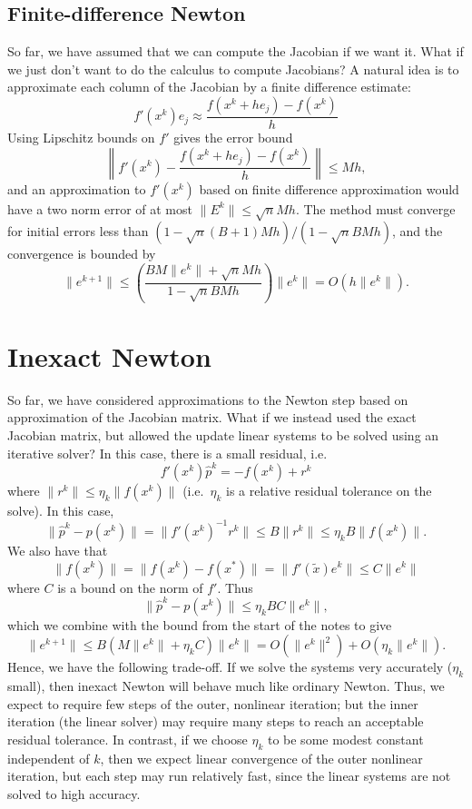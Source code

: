 \documentclass[12pt, leqno]{article} %
\begin{document}
\subsection*{Finite-difference Newton}

So far, we have assumed that we can compute the Jacobian if we want
it.  What if we just don't want to do the calculus to compute
Jacobians?  A natural idea is to approximate each column of the
Jacobian by a finite difference estimate:
\[
  f'(x^k) e_j \approx \frac{f(x^k+he_j)-f(x^k)}{h}
\]
Using Lipschitz bounds on $f'$ gives the error bound
\[
  \left\| f'(x^k) - \frac{f(x^k+he_j)-f(x^k)}{h} \right\| \leq Mh,
\]
and an approximation to $f'(x^k)$ based on finite difference
approximation would have a two norm error of at most
$\|E^k\| \leq \sqrt{n} M h$.  The method must converge for
initial errors less than $(1-\sqrt{n} (B+1) Mh)/(1-\sqrt{n} BMh)$,
and the convergence is bounded by
\[
  \|e^{k+1}\| \leq
  \left( \frac{BM\|e^k\| + \sqrt{n}Mh}{1-\sqrt{n} BMh} \right) \|e^k\| =
  O(h\|e^k\|).
\]

\section*{Inexact Newton}

So far, we have considered approximations to the Newton step based on
approximation of the Jacobian matrix.  What if we instead used the
exact Jacobian matrix, but allowed the update linear systems to be solved
using an iterative solver?  In this case, there is a small residual,
i.e.
\[
  f'(x^k) \hat{p}^k = -f(x^k) + r^k
\]
where $\|r^k\| \leq \eta_k \|f(x^k)\|$ (i.e.~$\eta_k$ is a relative
residual tolerance on the solve).  In this case,
\[
  \|\hat{p}^k-p(x^k)\| = \|f'(x^k)^{-1} r^k\| \leq B \|r^k\| \leq
  \eta_k B \|f(x^k)\|.
\]
We also have that
\[
  \|f(x^k)\| = \|f(x^k)-f(x^*)\| = \|f'(\tilde{x}) e^k\| \leq C \|e^k\|
\]
where $C$ is a bound on the norm of $f'$.  Thus
\[
  \|\hat{p}^k-p(x^k)\| \leq \eta_k BC \|e^k\|,
\]
which we combine with the bound from the start of the notes to give
\[
\|e^{k+1}\| \leq B(M \|e^k\| + \eta_k C) \|e^k\|
  = O(\|e^k\|^2) + O(\eta_k \|e^k\|).
\]
Hence, we have the following trade-off.  If we solve the systems very
accurately ($\eta_k$ small), then inexact Newton will behave much
like ordinary Newton.  Thus, we expect to require few steps of the
outer, nonlinear iteration; but the inner iteration (the linear
solver) may require many steps to reach an acceptable residual
tolerance.  In contrast, if we choose $\eta_k$ to be some modest
constant independent of $k$, then we expect linear convergence of the
outer nonlinear iteration, but each step may run relatively fast,
since the linear systems are not solved to high accuracy.
\end{document}
